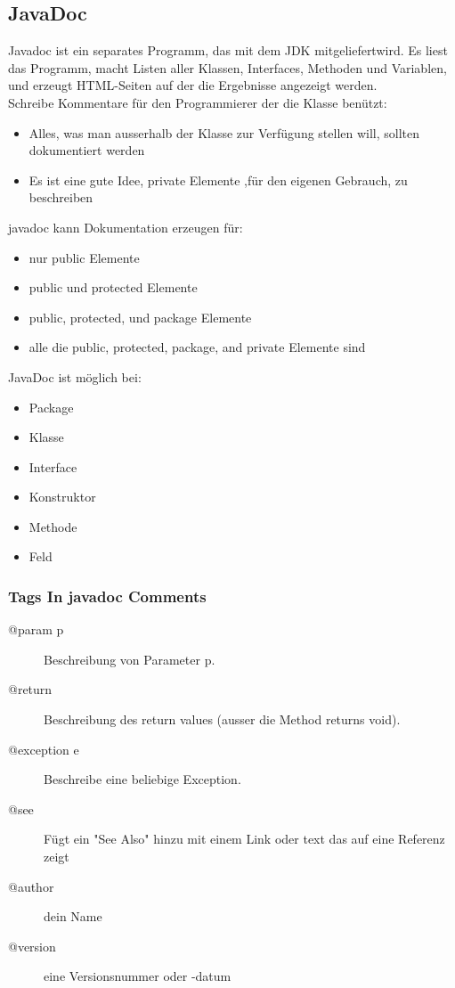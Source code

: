 \documentclass[a4paper,10pt]{article}
\begin{document}
\subsection{JavaDoc}
Javadoc ist ein separates Programm, das mit dem JDK mitgeliefertwird. Es liest das Programm, macht Listen aller Klassen, Interfaces, Methoden und Variablen, und erzeugt HTML-Seiten auf der die Ergebnisse angezeigt werden. \\
Schreibe Kommentare f\"{u}r den Programmierer der die Klasse ben\"{u}tzt: 
\begin{itemize}
	\item Alles, was man ausserhalb der Klasse zur Verf\"{u}gung stellen will, sollten dokumentiert werden
	\item Es ist eine gute Idee, private Elemente  ,f\"{u}r den eigenen Gebrauch, zu beschreiben
\end{itemize}
javadoc kann Dokumentation erzeugen f\"{u}r:
\begin{itemize}
	\item nur public Elemente
	\item public und protected Elemente
	\item public, protected, und package Elemente
	\item alle die public, protected, package, and private Elemente sind
\end{itemize}
JavaDoc ist m\"{o}glich bei:
\begin{itemize}
	\item Package
	\item Klasse
	\item Interface
	\item Konstruktor
	\item Methode	
	\item Feld
\end{itemize}

\subsubsection{Tags In javadoc Comments}
\begin{description}
	\item[@param p] Beschreibung von Parameter p.
	\item[@return] Beschreibung des return values (ausser die Method returns void).
	\item[@exception e] Beschreibe eine beliebige Exception.
	\item[@see] F\"{u}gt ein "See Also" hinzu mit einem Link oder text das auf eine Referenz zeigt
	\item[@author] dein Name
	\item[@version] eine Versionsnummer oder -datum
\end{description}
\end{document}
